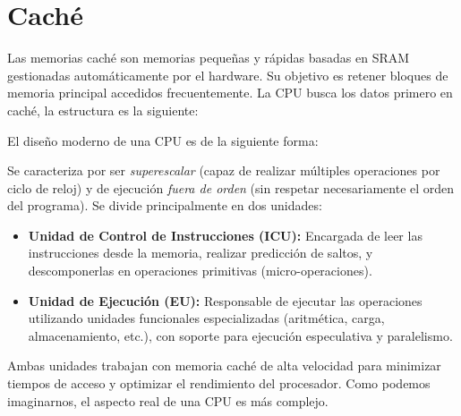 \chapter{Caché}
Las memorias caché son memorias pequeñas y rápidas basadas en 
SRAM gestionadas automáticamente por el hardware. Su objetivo es retener bloques de memoria principal
accedidos frecuentemente. La CPU busca los datos primero en caché, la estructura es la siguiente:
\begin{center}
    
\end{center}
El diseño moderno de una CPU es de la siguiente forma:
\begin{center}
    
\end{center}
Se caracteriza por ser \textit{superescalar} (capaz de realizar múltiples operaciones por ciclo de reloj) y de ejecución \textit{fuera de orden} (sin respetar necesariamente el orden del programa). Se divide principalmente en dos unidades:
\begin{itemize}
    \item \textbf{Unidad de Control de Instrucciones (ICU):} Encargada de leer las instrucciones desde la memoria, realizar predicción de saltos, y descomponerlas en operaciones primitivas (micro-operaciones).  
    \item \textbf{Unidad de Ejecución (EU):} Responsable de ejecutar las operaciones utilizando unidades funcionales especializadas (aritmética, carga, almacenamiento, etc.), con soporte para ejecución especulativa y paralelismo.
\end{itemize}

Ambas unidades trabajan con memoria caché de alta velocidad para minimizar tiempos de acceso y optimizar el rendimiento del procesador.
Como podemos imaginarnos, el aspecto real de una CPU es más complejo.
